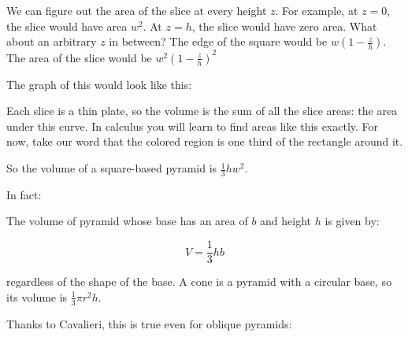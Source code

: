 We can figure out the area of the slice at every height $z$.  For
example, at $z = 0$, the slice would have area $w^2$.  At $z = h$, the
slice would have zero area.  What about an arbitrary $z$ in between?
The edge of the square would be $w (1 - \frac{z}{h})$.  The area of
the slice would be $w^2 (1 - \frac{z}{h})^2$

The graph of this would look like this:


Each slice is a thin plate, so the volume is the sum of all the slice
areas: the area under this curve. In calculus you will learn to find areas
like this exactly. For now, take our word that the colored region is one
third of the rectangle around it.

So the volume of a square-based pyramid is $\frac{1}{3} h w^2$.

In fact:

\begin{mdframed}[style=important, frametitle={Volume of a pyramid}]

  The volume of pyramid whose base has an area of $b$ and height $h$ is given by:

  $$V = \frac{1}{3} h b$$

  regardless of the shape of the base. A cone is a pyramid with a circular
  base, so its volume is $\frac{1}{3}\pi r^2 h$.
\end{mdframed}

Thanks to Cavalieri, this is true even for oblique pyramids:

